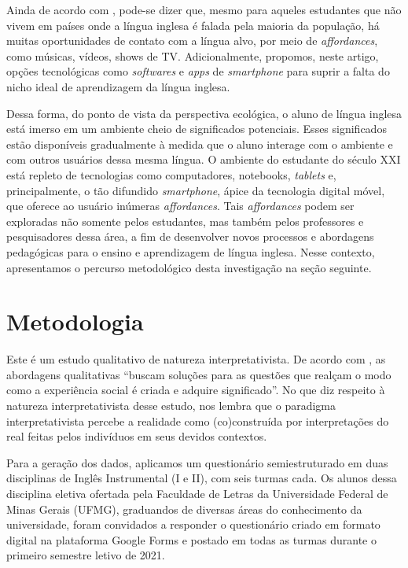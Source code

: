 \documentclass[portuguese]{textolivre}
\begin{document}
Ainda de acordo com \textcite{paiva2011}, pode-se dizer que, mesmo para aqueles estudantes que não vivem em países onde a língua inglesa é falada pela maioria da população, há muitas oportunidades de contato com a língua alvo, por meio de \emph{affordances}, como músicas, vídeos, shows de TV. Adicionalmente, propomos, neste artigo, opções tecnológicas como \emph{softwares} e \emph{apps} de \emph{smartphone} para suprir a falta do nicho ideal de aprendizagem da língua inglesa.

Dessa forma, do ponto de vista da perspectiva ecológica, o aluno de língua inglesa está imerso em um ambiente cheio de significados potenciais. Esses significados estão disponíveis gradualmente à medida que o aluno interage com o ambiente e com outros usuários dessa mesma língua. O ambiente do estudante do século XXI está repleto de tecnologias como computadores, notebooks, \emph{tablets} e, principalmente, o tão difundido \emph{smartphone}, ápice da tecnologia digital móvel, que oferece ao usuário inúmeras \emph{affordances}. Tais \emph{affordances} podem ser exploradas não somente pelos estudantes, mas também pelos professores e pesquisadores dessa área, a fim de desenvolver novos processos e abordagens pedagógicas para o ensino e aprendizagem de língua inglesa. Nesse contexto, apresentamos o percurso metodológico desta investigação na seção seguinte.

\section{Metodologia}
Este é um estudo qualitativo de natureza interpretativista. De acordo com \textcite[p. 3]{denzin_o_2008}, as abordagens qualitativas “buscam soluções para as questões que realçam o modo como a experiência social é criada e adquire significado”. No que diz respeito à natureza interpretativista desse estudo, \textcite{sarmento2011estudo} nos lembra que o paradigma interpretativista percebe a realidade como (co)construída por interpretações do real feitas pelos indivíduos em seus devidos contextos.

Para a geração dos dados, aplicamos um questionário semiestruturado em duas disciplinas de Inglês Instrumental (I e II), com seis turmas cada. Os alunos dessa disciplina eletiva ofertada pela Faculdade de Letras da Universidade Federal de Minas Gerais (UFMG), graduandos de diversas áreas do conhecimento da universidade, foram convidados a responder o questionário criado em formato digital na plataforma Google Forms e postado em todas as turmas durante o primeiro semestre letivo de 2021.
\end{document}
